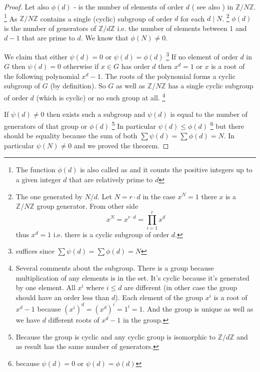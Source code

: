 \begin{theorem}
\begin{proof}
    Let also $\phi\left(d\right)$ - is the number of elements of order $d$
    ( see also ) in $\mathbb{Z}/N\mathbb{Z}$.
    \footnote{      
      The function $\phi\left(d\right)$ is also called as
      and it 
      counts the positive integers up to a given integer $d$ that are
      relatively prime to $d$ 
    }
    As $\mathbb{Z}/N\mathbb{Z}$ contains a single (cyclic) subgroup of
    order $d$ for each $d \mid N$.
    \footnote{
      The one generated by $N/d$. Let $N = r \cdot d$ in the case
      $x^N = 1$ there $x$ is a $\mathbb{Z}/N\mathbb{Z}$ group
      generator. From other side
      \[
      x^N = x^{r \cdot d} = \prod_{i=1}^r x^d
      \]
      thus $x^d = 1$ i.e. there is a cyclic subgroup of order $d$.
    }
    $\phi\left(d\right)$ is the number of generators of
    $\mathbb{Z}/d\mathbb{Z}$ i.e. the number of elements between $1$
    and $d-1$ that are prime to $d$. We know that
    $\phi\left(N\right) \ne 0$.

    We claim that either $\psi\left(d\right) = 0$ or
    $\psi\left(d\right) = \phi\left(d\right)$
    \footnote{
      suffices since $\sum \psi\left(d\right) = \sum
      \phi\left(d\right) = N$
    }
    If no element of order $d$ in $G$ then $\psi\left(d\right) = 0$
    otherwise if $x \in G$ has order $d$ then $x^d = 1$ or $x$ is a
    root of the following polynomial $x^d - 1$. The roots of the
    polynomial forms a cyclic subgroup of $G$ (by
     definition).
    So $G$ as well as
    $\mathbb{Z}/N\mathbb{Z}$ has a single cyclic subgroup of order
    $d$ (which is cyclic) or no such group at all.
    \footnote{
      Several comments about the subgroup. There is a group
      because multiplication of any elements is in the set. It's
      cyclic because it's generated by one element.
      All $x^i$ where $i \le d$ are different (in other case the group
      should have an order less than $d$). Each element of the group
      $x^i$ is a root of $x^d - 1$ because $(x^i)^d = (x^d)^i = 1^i =
      1$. And the group is unique as well as we have $d$ different
      roots of $x^d-1$ in the group. 
    }

    
    If $\psi\left(d\right) \ne 0$ then exists such a subgroup and
    $\psi\left(d\right)$ is equal to the number of generators of that
    group or $\phi\left(d\right)$
    \footnote{
      Because the group is cyclic and any cyclic group is isomorphic
      to $\mathbb{Z}/d\mathbb{Z}$ and as result has the same number of
      generators. 
    }
    In particular $\psi\left(d\right) \le \phi\left(d\right)$
    \footnote{
      because $\psi\left(d\right) = 0$ or
      $\psi\left(d\right) = \phi\left(d\right)$
    }
    but there should be equality because the sum of both $\sum
    \psi\left(d\right) = \sum \phi\left(d\right) = N$.
    In particular $\psi\left(N\right) \ne 0$ and we proved the
    theorem.
  \end{proof}
  \label{thm:lec3_2}
\end{theorem}
